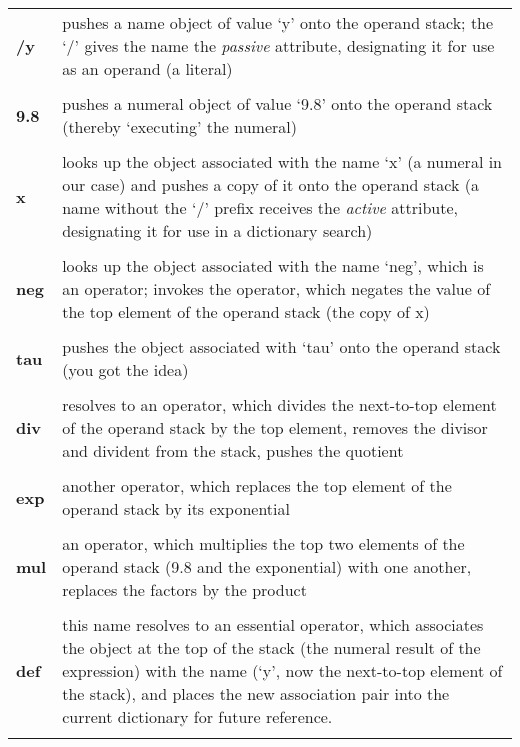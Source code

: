 \begin{supertabular}{>{\sffamily\bfseries}p{1cm}>{\normalfont}p{9cm}}
/y & pushes a name object of value `y' onto the operand stack; the `/' gives the name the \emph{passive} attribute, designating it for use as an operand (a literal)\\\\
 
9.8 & pushes  a  numeral  object of value `9.8' onto  the  operand  stack (thereby `executing' the numeral)\\\\

x & looks up the object associated with the name `x' (a numeral in  our case) and pushes a copy of it onto the operand stack (a name without  the `/' prefix receives the \emph{active} attribute, designating it for use in    a dictionary  search)\\\\

neg & looks up the object associated with the name `neg',  which is an operator;  invokes the operator,  which negates the value of the top element of the operand stack (the copy of x)\\\\
 
tau & pushes the object associated with `tau' onto the operand stack  (you got the idea)\\\\

div & resolves to an operator, which divides the next-to-top element of the operand stack by the  top element, removes the divisor and divident from the stack, pushes the quotient\\\\
 
exp & another operator, which replaces the top element of the operand stack by its exponential\\\\

mul & an operator, which multiplies  the  top two elements of the operand stack  (9.8 and the exponential) with one another, replaces the factors by the product\\\\

def & this  name resolves to an essential operator,  which  associates the  object at the top of the stack (the numeral result  of  the expression) with the name (`y',  now the next-to-top element  of the stack), and places the new association pair into the current dictionary for future reference.\\\\

\end{supertabular}

